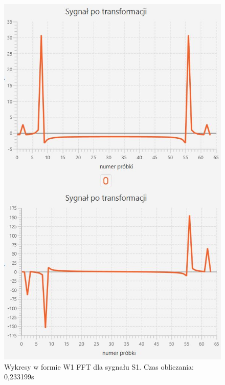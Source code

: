 \documentclass[12pt]{article}
\begin{document}
\begin{figure}[H]
	\centering
	\includegraphics[width=.8\linewidth]{FFT-S1-W1}
	\caption{Wykresy w formie W1 FFT dla sygnału S1. Czas obliczania: 0,233199s}
	\label{S3_sygnal}
\end{figure}
\end{document}
